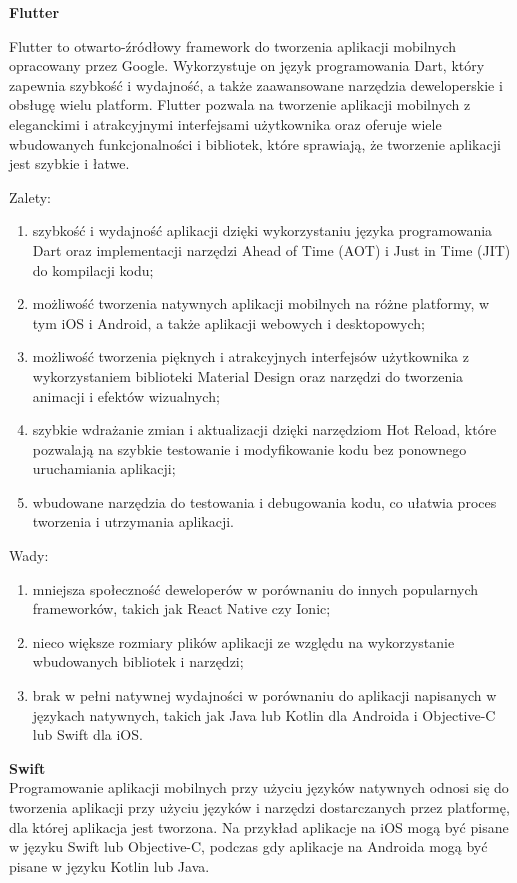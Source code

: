 \documentclass[12pt, a4paper, twoside, openany]{book}
\begin{document}
\textbf{Flutter\\}

Flutter to otwarto-źródłowy framework do tworzenia aplikacji mobilnych opracowany przez Google. Wykorzystuje on język programowania Dart, który zapewnia szybkość i wydajność, a także zaawansowane narzędzia deweloperskie i obsługę wielu platform. Flutter pozwala na tworzenie aplikacji mobilnych z eleganckimi i atrakcyjnymi interfejsami użytkownika oraz oferuje wiele wbudowanych funkcjonalności i bibliotek, które sprawiają, że tworzenie aplikacji jest szybkie i łatwe.
    
Zalety:
\begin{enumerate}[label=--]
    \item szybkość i wydajność aplikacji dzięki wykorzystaniu języka programowania Dart oraz implementacji narzędzi Ahead of Time (AOT) i Just in Time (JIT) do kompilacji kodu;
    \item możliwość tworzenia natywnych aplikacji mobilnych na różne platformy, w tym iOS i Android, a także aplikacji webowych i desktopowych;
    \item możliwość tworzenia pięknych i atrakcyjnych interfejsów użytkownika z wykorzystaniem biblioteki Material Design oraz narzędzi do tworzenia animacji i efektów wizualnych;
    \item szybkie wdrażanie zmian i aktualizacji dzięki narzędziom Hot Reload, które pozwalają na szybkie testowanie i modyfikowanie kodu bez ponownego uruchamiania aplikacji;
    \item wbudowane narzędzia do testowania i debugowania kodu, co ułatwia proces tworzenia i utrzymania aplikacji.
\end{enumerate}

Wady:
\begin{enumerate}[label=--]
 \item mniejsza społeczność deweloperów w porównaniu do innych popularnych frameworków, takich jak React Native czy Ionic;
 \item nieco większe rozmiary plików aplikacji ze względu na wykorzystanie wbudowanych bibliotek i narzędzi;
 \item brak w pełni natywnej wydajności w porównaniu do aplikacji napisanych w językach natywnych, takich jak Java lub Kotlin dla Androida i Objective-C lub Swift dla iOS.
\end{enumerate}

\textbf{Swift\\}
Programowanie aplikacji mobilnych przy użyciu języków natywnych odnosi się do tworzenia aplikacji przy użyciu języków i narzędzi dostarczanych przez platformę, dla której aplikacja jest tworzona. Na przykład aplikacje na iOS mogą być pisane w języku Swift lub Objective-C, podczas gdy aplikacje na Androida mogą być pisane w języku Kotlin lub Java.
    
\end{document}
